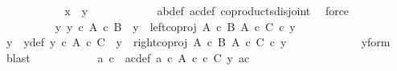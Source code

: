 \begin{isabellebody}
\ \ \ \ \ \ \ \ \isamarkupfalse%
\ \isamarkupfalse%
\ {\isachardoublequoteopen}x\ {\isacharequal}{\kern0pt}\ y{\isachardoublequoteclose}\isanewline
\ \ \ \ \ \ \ \ \ \ \isamarkupfalse%
\ a{\isacharprime}{\kern0pt}b{\isacharprime}{\kern0pt}{\isacharunderscore}{\kern0pt}def\ ac{\isacharunderscore}{\kern0pt}def\ coproducts{\isacharunderscore}{\kern0pt}disjoint\ \isamarkupfalse%
\ force\isanewline
\ \ \ \ \ \ \isamarkupfalse%
\ \isanewline
\ \ \ \ \ \ \ \ \isamarkupfalse%
\ {\isachardoublequoteopen}{\isasymnexists}y{\isacharprime}{\kern0pt}{\isachardot}{\kern0pt}\ y{\isacharprime}{\kern0pt}\ {\isasymin}\isactrlsub c\ A\ {\isasymtimes}\isactrlsub c\ B\ {\isasymand}\ y\ {\isacharequal}{\kern0pt}\ left{\isacharunderscore}{\kern0pt}coproj\ {\isacharparenleft}{\kern0pt}A\ {\isasymtimes}\isactrlsub c\ B{\isacharparenright}{\kern0pt}\ {\isacharparenleft}{\kern0pt}A\ {\isasymtimes}\isactrlsub c\ C{\isacharparenright}{\kern0pt}\ {\isasymcirc}\isactrlsub c\ y{\isacharprime}{\kern0pt}{\isachardoublequoteclose}\isanewline
\ \ \ \ \ \ \ \ \isamarkupfalse%
\ \isamarkupfalse%
\ y{\isacharprime}{\kern0pt}\ \ y{\isacharprime}{\kern0pt}{\isacharunderscore}{\kern0pt}def{\isacharcolon}{\kern0pt}\ {\isachardoublequoteopen}y{\isacharprime}{\kern0pt}\ {\isasymin}\isactrlsub c\ {\isacharparenleft}{\kern0pt}A\ {\isasymtimes}\isactrlsub c\ C{\isacharparenright}{\kern0pt}\ {\isasymand}\ y\ {\isacharequal}{\kern0pt}\ right{\isacharunderscore}{\kern0pt}coproj\ {\isacharparenleft}{\kern0pt}A\ {\isasymtimes}\isactrlsub c\ B{\isacharparenright}{\kern0pt}\ {\isacharparenleft}{\kern0pt}A\ {\isasymtimes}\isactrlsub c\ C{\isacharparenright}{\kern0pt}\ {\isasymcirc}\isactrlsub c\ y{\isacharprime}{\kern0pt}{\isachardoublequoteclose}\isanewline
\ \ \ \ \ \ \ \ \ \ \isamarkupfalse%
\ \ y{\isacharunderscore}{\kern0pt}form\ \isamarkupfalse%
\ blast\isanewline
\ \ \ \ \ \ \ \ \isamarkupfalse%
\ \isamarkupfalse%
\ a{\isacharprime}{\kern0pt}\ c{\isacharprime}{\kern0pt}\ \ a{\isacharprime}{\kern0pt}c{\isacharprime}{\kern0pt}{\isacharunderscore}{\kern0pt}def{\isacharcolon}{\kern0pt}\ {\isachardoublequoteopen}a{\isacharprime}{\kern0pt}\ {\isasymin}\isactrlsub c\ A{\isachardoublequoteclose}\ {\isachardoublequoteopen}c{\isacharprime}{\kern0pt}\ {\isasymin}\isactrlsub c\ C{\isachardoublequoteclose}\ {\isachardoublequoteopen}y{\isacharprime}{\kern0pt}\ {\isacharequal}{\kern0pt}{\isasymlangle}a{\isacharprime}{\kern0pt}{\isacharcomma}{\kern0pt}c{\isacharprime}{\kern0pt}{\isasymrangle}{\isachardoublequoteclose}\isanewline

\end{isabellebody}
